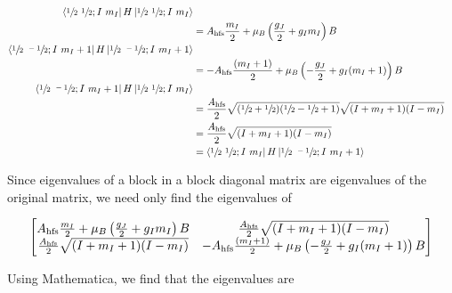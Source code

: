 \documentclass[]{article}
\begin{document}
\begin{enumerate}[1)]
\begin{equation}
\begin{split}
\bra{ \sfrac{1}{2} \text{ }  \sfrac{1}{2} ; I\text{ }m_I}  H \ket{ \sfrac{1}{2} \text{ } \sfrac{1}{2}; I\text{ }m_I}   \\ & = A_\text{hfs} \frac{m_I}{2} + \mu_B\left( \frac{g_J}{2} + g_I m_I \right) B \\
\bra{ \sfrac{1}{2} \text{ } \sfrac{-1}{2} ; I \text{ }m_I + 1}  H \ket{ \sfrac{1}{2} \text{ }  \sfrac{-1}{2}; I \text{ }m_I + 1}   \\ & =  - A_\text{hfs} \frac{(m_I+1)}{2} + \mu_B \left( -  \frac{g_J}{2} + g_I (m_I+1) \right) B \\
\bra{ \sfrac{1}{2} \text{ } \sfrac{-1}{2} ; I \text{ }m_I + 1}  H \ket{ \sfrac{1}{2} \text{ }  \sfrac{1}{2}; I \text{ }m_I }  \\ & = \frac{ A_\text{hfs} }{2} \sqrt{ (\sfrac{1}{2} + \sfrac{1}{2}) ( \sfrac{1}{2} - \sfrac{1}{2} +1)} \sqrt{ (I + m_I + 1)(I - m_I)  } \\
& = \frac{ A_\text{hfs} }{2} \sqrt{ (I + m_I + 1)(I - m_I)  } \\
& = \bra{ \sfrac{1}{2} \text{ } \sfrac{1}{2} ; I \text{ }m_I }  H \ket{ \sfrac{1}{2} \text{ }  \sfrac{-1}{2}; I \text{ }m_I +1}
\\
\end{split}
\end{equation}

Since eigenvalues of a block in a block diagonal matrix are eigenvalues of the original matrix, we need only find the eigenvalues of 

\begin{equation}
\begin{split}
\left[    \mqty{  A_\text{hfs} \frac{m_I}{2} + \mu_B\left( \frac{g_J}{2} + g_I m_I \right) B &   \frac{ A_\text{hfs} }{2} \sqrt{ (I + m_I + 1)(I - m_I)  }  \\ \frac{ A_\text{hfs} }{2} \sqrt{ (I + m_I + 1)(I - m_I)  }  &   - A_\text{hfs} \frac{(m_I+1)}{2} + \mu_B \left( -  \frac{g_J}{2} + g_I (m_I+1) \right) B    }   \right]  \\
\end{split}
\end{equation}

Using Mathematica, we find that the eigenvalues are


\end{enumerate}
\end{document}
